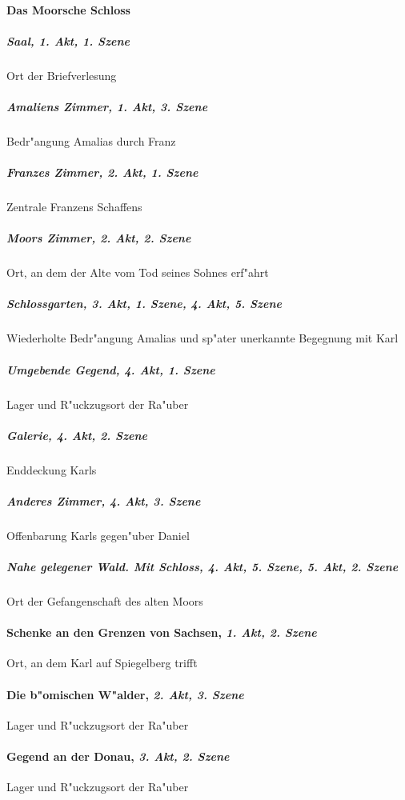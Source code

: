 \paragraph{Das Moorsche Schloss}
	\subparagraph{Saal, \textit{1. Akt, 1. Szene}}
		Ort der Briefverlesung
	\subparagraph{Amaliens Zimmer, \textit{1. Akt, 3. Szene}}
		Bedr"angung Amalias durch Franz
	\subparagraph{Franzes Zimmer, \textit{2. Akt, 1. Szene}}
		Zentrale Franzens Schaffens
	\subparagraph{Moors Zimmer, \textit{2. Akt, 2. Szene}}
		Ort, an dem der Alte vom Tod seines Sohnes erf"ahrt
	\subparagraph{Schlossgarten, \textit{3. Akt, 1. Szene}, \textit{4. Akt, 5. Szene}}
		Wiederholte Bedr"angung Amalias und sp"ater unerkannte Begegnung mit Karl
	\subparagraph{Umgebende Gegend, \textit{4. Akt, 1. Szene}}
		Lager und R"uckzugsort der Ra"uber
	\subparagraph{Galerie, \textit{4. Akt, 2. Szene}}
		Enddeckung Karls
	\subparagraph{Anderes Zimmer, \textit{4. Akt, 3. Szene}}
		Offenbarung Karls gegen"uber Daniel
	\subparagraph{Nahe gelegener Wald. Mit Schloss, \textit{4. Akt, 5. Szene}, \textit{5. Akt, 2. Szene}}
		Ort der Gefangenschaft des alten Moors
\paragraph{Schenke an den Grenzen von Sachsen, \textit{1. Akt, 2. Szene}}
Ort, an dem Karl auf Spiegelberg trifft
\paragraph{Die b"omischen W"alder, \textit{2. Akt, 3. Szene}}
Lager und R"uckzugsort der Ra"uber
\paragraph{Gegend an der Donau, \textit{3. Akt, 2. Szene}}
Lager und R"uckzugsort der Ra"uber
